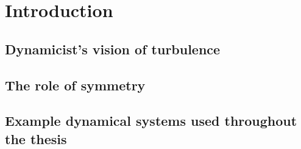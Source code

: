 \begin{preliminary}

    \ifpaper               %
    \begin{dedication}
        
    \end{dedication}
    \fi

    \begin{preface}
        
    \end{preface}

    \begin{acknowledgements}
        
    \end{acknowledgements}

    \contents

    \begin{summary}
%
    \end{summary}

\end{preliminary}


\ifboyscout \pagestyle{headings} \fi  %

\chapter{Introduction}
%

	\section{Dynamicist's vision of turbulence}
	\label{s:hopf}
    	
	\section{The role of symmetry}
	\label{s:symIntro}
        
	
	\section{Example dynamical systems used throughout the thesis}
	\label{s:exampleIntro}
	


